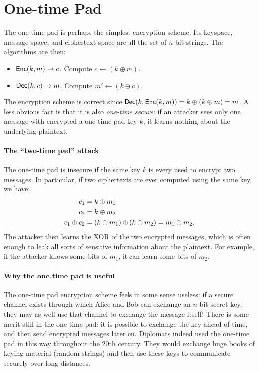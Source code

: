 \section{One-time Pad}
The one-time pad is perhaps the simplest encryption scheme.
Its keyspace, message space, and ciphertext space are all the set of $n$-bit strings.
The algorithms are then:
\begin{itemize}
  \item $\mathsf{Enc}(k, m) \to c$. Compute $c \gets (k \oplus m)$.
  \item $\mathsf{Dec}(k, c) \to m$. Compute $m' \gets (k \oplus c)$.
\end{itemize}

The encryption scheme is correct since $\mathsf{Dec}(k, \mathsf{Enc}(k, m)) = k \oplus (k \oplus m) = m$.
A less obvious fact is that it is also \emph{one-time secure}:
if an attacker sees only one message with encrypted a one-time-pad key $k$,
it learns nothing about the underlying plaintext.

\paragraph{The ``two-time pad'' attack}
The one-time pad is insecure if the same key $k$ is every used to 
encrypt two messages.
In particular, if two ciphertexts are ever computed using the same key, we
have:
\begin{align*}
  c_1 &= k \oplus m_1 \\
  c_2 &= k \oplus m_2 \\ 
  c_1 \oplus c_2 &= (k \oplus m_1) \oplus (k \oplus m_2) = m_1 \oplus m_2.
\end{align*}
The attacker then learns the XOR of the two encrypted messages,
which is often enough to leak all sorts of sensitive information
about the plaintext.
For example, if the attacker knows some bits of $m_1$, it can learn
some bits of $m_2$.

\paragraph{Why the one-time pad is useful}
The one-time pad encryption scheme feels in some sense useless: if a secure channel exists through which Alice and Bob can exchange an $n$-bit secret key, they may as well use that channel to exchange the message itself!
There is some merit still in the one-time pad: it is possible
to exchange the key ahead of time, and then send encrypted messages
later on.
Diplomats indeed used the one-time pad in this way throughout the 20th century.
They would exchange huge books of keying material (random strings) 
and then use these keys to communicate securely over long distances.


